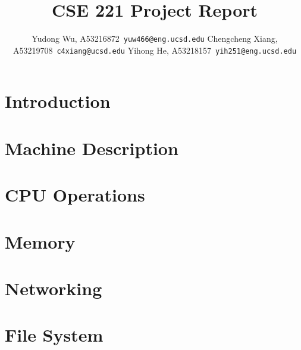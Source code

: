 \documentclass{article}
\begin{document}

\setlength{\parskip}{1em}


\title{CSE 221 Project Report}

\author{Yudong Wu, A53216872\ \texttt{yuw466@eng.ucsd.edu}
        Chengcheng Xiang, A53219708\ \texttt{c4xiang@ucsd.edu}
        Yihong He, A53218157\ \texttt{yih251@eng.ucsd.edu}
}

\maketitle

\lstset{
    numbers=left,
    numberstyle=\footnotesize,
    stepnumber=1,
    numbersep=5pt,
    basicstyle=\footnotesize,
    frame=single,
    tabsize=2,
    breaklines=true,
    xleftmargin=2em,
    xrightmargin=2em,
}

\section{Introduction}




\section{Machine Description}



\section{CPU Operations}


\section{Memory}


\section{Networking}


\section{File System}

\end{document}

